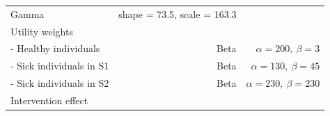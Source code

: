 \documentclass[]{article}
\begin{document}
\begin{longtable}[]{@{}lrr@{}}
\begin{minipage}[t]{0.17\columnwidth}
Gamma\strut
\end{minipage} & \begin{minipage}[t]{0.42\columnwidth}\raggedleft\strut
shape = 73.5, scale = 163.3\strut
\end{minipage}\tabularnewline
\begin{minipage}[t]{0.32\columnwidth}\raggedright\strut
Utility weights\strut
\end{minipage} & \begin{minipage}[t]{0.17\columnwidth}\raggedleft\strut
\strut
\end{minipage} & \begin{minipage}[t]{0.42\columnwidth}\raggedleft\strut
\strut
\end{minipage}\tabularnewline
\begin{minipage}[t]{0.32\columnwidth}\raggedright\strut
- Healthy individuals\strut
\end{minipage} & \begin{minipage}[t]{0.17\columnwidth}\raggedleft\strut
Beta\strut
\end{minipage} & \begin{minipage}[t]{0.42\columnwidth}\raggedleft\strut
\(\alpha = 200, \ \beta = 3\)\strut
\end{minipage}\tabularnewline
\begin{minipage}[t]{0.32\columnwidth}\raggedright\strut
- Sick individuals in S1\strut
\end{minipage} & \begin{minipage}[t]{0.17\columnwidth}\raggedleft\strut
Beta\strut
\end{minipage} & \begin{minipage}[t]{0.42\columnwidth}\raggedleft\strut
\(\alpha = 130, \ \beta = 45\)\strut
\end{minipage}\tabularnewline
\begin{minipage}[t]{0.32\columnwidth}\raggedright\strut
- Sick individuals in S2\strut
\end{minipage} & \begin{minipage}[t]{0.17\columnwidth}\raggedleft\strut
Beta\strut
\end{minipage} & \begin{minipage}[t]{0.42\columnwidth}\raggedleft\strut
\(\alpha = 230, \ \beta = 230\)\strut
\end{minipage}\tabularnewline
\begin{minipage}[t]{0.32\columnwidth}\raggedright\strut
Intervention effect\strut
\end{minipage} & \begin{minipage}[t]{0.17\columnwidth}\raggedleft\strut

\end{minipage}
\end{longtable}
\end{document}
